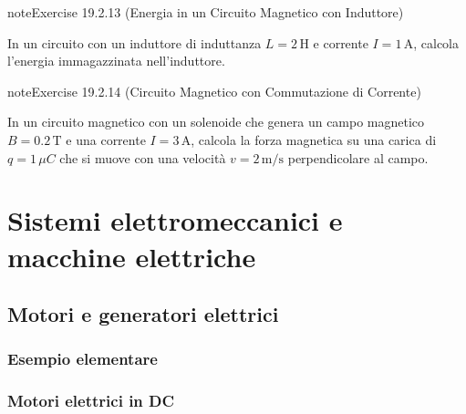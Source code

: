 \documentclass[letterpaper,10pt,italian]{jupyterBook}
\begin{document}
\begin{sphinxadmonition}{note}{Exercise 19.2.13 (Energia in un Circuito Magnetico con Induttore)}



\sphinxAtStartPar
In un circuito con un induttore di induttanza \(L = 2 \, \text{H}\) e corrente \(I = 1 \, \text{A}\), calcola l’energia immagazzinata nell’induttore.
\end{sphinxadmonition}
 \label{exercise:ch/electromagnetism/circuits-magnetic-problems-exercise-13}

\begin{sphinxadmonition}{note}{Exercise 19.2.14 (Circuito Magnetico con Commutazione di Corrente)}



\sphinxAtStartPar
In un circuito magnetico con un solenoide che genera un campo magnetico \(B = 0.2 \, \text{T}\) e una corrente \(I = 3 \, \text{A}\), calcola la forza magnetica su una carica di \(q = 1 \, \mu C\) che si muove con una velocità \(v = 2 \, \text{m/s}\) perpendicolare al campo.
\end{sphinxadmonition}

\sphinxstepscope


\section{Sistemi elettromeccanici e macchine elettriche}
\label{\detokenize{ch/electromagnetism/electric-machines:sistemi-elettromeccanici-e-macchine-elettriche}}\label{\detokenize{ch/electromagnetism/electric-machines:physics-hs-electromagnetism-electric-machines}}\label{\detokenize{ch/electromagnetism/electric-machines::doc}}

\subsection{Motori e generatori elettrici}
\label{\detokenize{ch/electromagnetism/electric-machines:motori-e-generatori-elettrici}}

\subsubsection{Esempio elementare}
\label{\detokenize{ch/electromagnetism/electric-machines:esempio-elementare}}

\subsubsection{Motori elettrici in DC}
\label{\detokenize{ch/electromagnetism/electric-machines:motori-elettrici-in-dc}}
\end{document}
